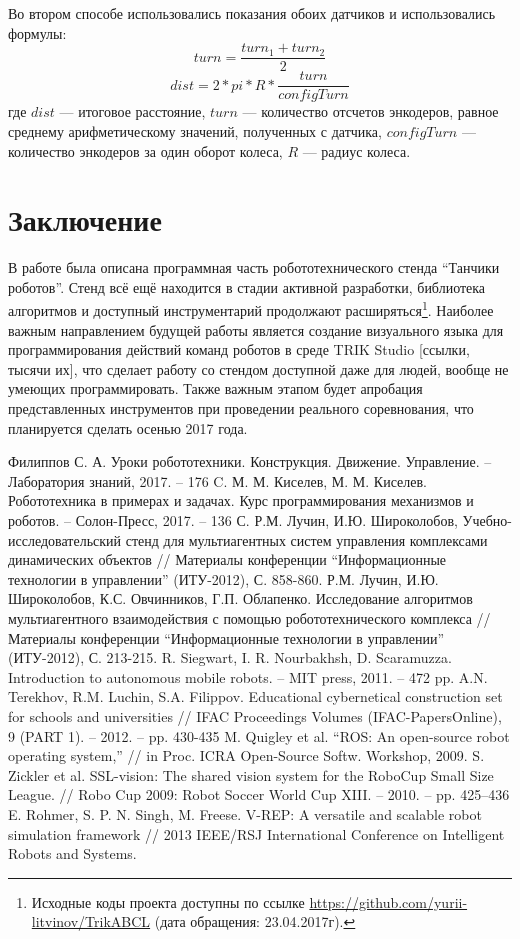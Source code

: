 \documentclass{spisok-article}
\begin{document}
Во втором способе использовались показания обоих датчиков и использовались формулы:
$$turn = \frac{turn_1 + turn_2}{2}$$
$$dist = 2 * pi * R * \frac{turn}{configTurn}$$
где $dist$ --- итоговое расстояние, $turn$ --- количество отсчетов энкодеров, равное среднему арифметическому значений, полученных с датчика, $configTurn$ --- количество энкодеров за один оборот колеса, $R$ --- радиус колеса.

\section{Заключение}

В работе была описана программная часть робототехнического стенда ``Танчики роботов''. Стенд всё ещё находится в стадии активной разработки, библиотека алгоритмов и доступный инструментарий продолжают расширяться\footnote{Исходные коды проекта доступны по ссылке \url{https://github.com/yurii-litvinov/TrikABCL} (дата обращения: 23.04.2017г).}. Наиболее важным направлением будущей работы является создание визуального языка для программирования действий команд роботов в среде TRIK Studio [ссылки, тысячи их], что сделает работу со стендом доступной даже для людей, вообще не умеющих программировать. Также важным этапом будет апробация представленных инструментов при проведении реального соревнования, что планируется сделать осенью 2017 года.

\renewcommand\refname{Литература}
\begin{thebibliography}{8}
	 Филиппов С. А. Уроки робототехники. Конструкция. Движение. Управление. -- Лаборатория знаний, 2017. -- 176 C.
	 М. М. Киселев, М. М. Киселев. Робототехника в примерах и задачах. Курс программирования механизмов и роботов. -- Солон-Пресс, 2017. -- 136 С.
	 Р.М. Лучин, И.Ю. Широколобов, Учебно-исследовательский стенд для мультиагентных систем управления комплексами динамических объектов // Материалы конференции ``Информационные технологии в управлении'' (ИТУ-2012), С. 858-860.
	 Р.М. Лучин, И.Ю. Широколобов, К.С. Овчинников, Г.П. Облапенко. Исследование алгоритмов мультиагентного взаимодействия с помощью робототехнического комплекса // Материалы конференции ``Информационные технологии в управлении'' (ИТУ-2012), С. 213-215.
	 R. Siegwart, I. R. Nourbakhsh, D. Scaramuzza. Introduction to autonomous mobile robots. -- MIT press, 2011. -- 472 pp.
	 A.N. Terekhov, R.M. Luchin, S.A. Filippov. Educational cybernetical construction set for schools and universities // IFAC Proceedings Volumes (IFAC-PapersOnline), 9 (PART 1). -- 2012. -- pp. 430-435
	 M. Quigley et al. ``ROS: An open-source robot operating system,'' // in Proc. ICRA Open-Source Softw. Workshop, 2009.
	 S. Zickler et al. SSL-vision: The shared vision system for the RoboCup Small Size League. // Robo Cup 2009: Robot Soccer World Cup XIII. -- 2010. -- pp. 425–436
	 E. Rohmer, S. P. N. Singh, M. Freese. V-REP: A versatile and scalable robot simulation framework // 2013 IEEE/RSJ International Conference on Intelligent Robots and Systems.
\end{thebibliography}
\end{document}
